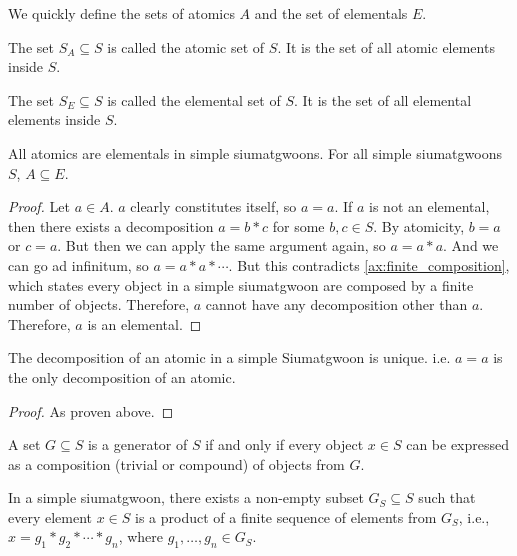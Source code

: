 We quickly define the sets of atomics $A$ and the set of elementals $E$.

\begin{definition}\label{def:atomic-set}
    The set $S_A \subseteq S$ is called the atomic set of $S$. It is the set of all atomic elements inside $S$.
\end{definition}

\begin{definition}\label{def:elemental-set}
    The set $S_E \subseteq S$ is called the elemental set of $S$. It is the set of all elemental elements inside $S$.
\end{definition}


\begin{lemma}\label{def:atomics-are-elementals-in-simple-siumatgwoons}
    All atomics are elementals in simple siumatgwoons. For all simple siumatgwoons $S$, $A \subseteq E$.
\end{lemma}
\begin{proof}
    Let $a \in A$. $a$ clearly constitutes itself, so $a=a$. If $a$ is not an elemental, then there exists a decomposition $a=b*c$ for some $b,c \in S$. By atomicity, $b=a$ or $c=a$. But then we can apply the same argument again, so $a=a*a$. And we can go ad infinitum, so $a=a*a*\cdots$. But this contradicts \ref{ax:finite_composition}, which states every object in a simple siumatgwoon are composed by a finite number of objects. Therefore, $a$ cannot have any decomposition other than $a$. Therefore, $a$ is an elemental.
\end{proof}


\begin{lemma}[Atomics]\label{def:atomics}
    The decomposition of an atomic in a simple Siumatgwoon is unique. i.e. $a=a$ is the only decomposition of an atomic.
\end{lemma}
\begin{proof}
    As proven above.
\end{proof}



\begin{definition}[Generators]\label{def:generators}
    A set $G \subseteq S$ is a generator of $S$ if and only if every object $x \in S$ can be expressed as a composition (trivial or compound) of objects from $G$.
\end{definition}

\begin{theorem}\label{thm:generator-sets-exist-in-simple-siumatgwoons}
    In a simple siumatgwoon, there exists a non-empty subset $G_{S} \subseteq S$ such that every element $x \in S$ is a product of a finite sequence of elements from $G_S$, i.e., $x = g_1 * g_2 * \cdots * g_n$, where $g_1, \dots, g_n \in G_S$.
\end{theorem}

